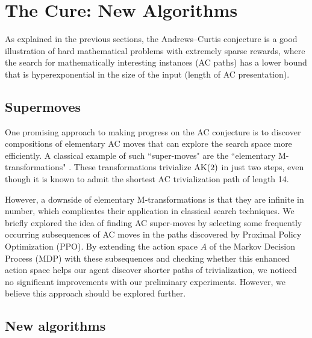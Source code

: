 \section{The Cure: New Algorithms}\label{sec:algo}

As explained in the previous sections, the Andrews--Curtis conjecture is a good illustration of hard mathematical problems with extremely sparse rewards, where the search for mathematically interesting instances (AC paths) has a lower bound that is hyperexponential in the size of the input (length of AC presentation).


\subsection{Supermoves}

One promising approach to making progress on the AC conjecture is to discover compositions of elementary AC moves that can explore the search space more efficiently. A classical example of such ``super-moves" are the ``elementary M-transformations" \cite{BurnsI, BurnsII}. These transformations trivialize $\text{AK}(2)$ in just two steps, even though it is known to admit the shortest AC trivialization path of length 14.

However, a downside of elementary M-transformations is that they are infinite in number, which complicates their application in classical search techniques. We briefly explored the idea of finding AC super-moves by selecting some frequently occurring subsequences of AC moves in the paths discovered by Proximal Policy Optimization (PPO). By extending the action space $A$ of the Markov Decision Process (MDP) with these subsequences and checking whether this enhanced action space helps our agent discover shorter paths of trivialization, we noticed no significant improvements with our preliminary experiments. However, we believe this approach should be explored further.

\subsection{New algorithms}